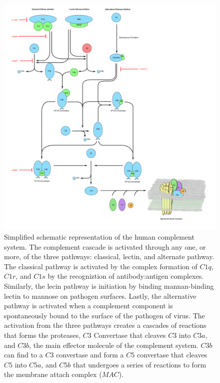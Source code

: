 \documentclass[12pt]{article}
\begin{document}
\begin{figure}[h]
\centering
\includegraphics[width=1.0\textwidth]{./figs/ComplementSystemSchematic_v2.pdf}
\caption{Simplified schematic representation of the human complement system. The complement cascade is activated through any one, or more, of the three pathways: classical, lectin, and alternate pathway. The classical pathway is activated by the complex formation of $C1q$, $C1r$, and $C1s$ by the recogniztion of antibody:antigen complexes. Similarly, the lecin pathway is initiation by binding mannan-binding lectin to mannose on pathogen surfaces. Lastly, the alternative pathway is activated when a complement component is spontaneously bound to the surface of the pathogen of virus. The activation from the three pathways creates a cascades of reactions that forms the proteases, $C3$ Convertase that cleaves $C3$ into $C3a$, and $C3b$, the main effector molecule of the complement system. $C3b$ can find to a $C3$ convertase and form a $C5$ convertase that cleaves $C5$ into $C5a$, and $C5b$ that undergoes a series of reactions to form the membrane attach complex ($MAC$).}\label{fig-schematic}
\end{figure}
\end{document}
